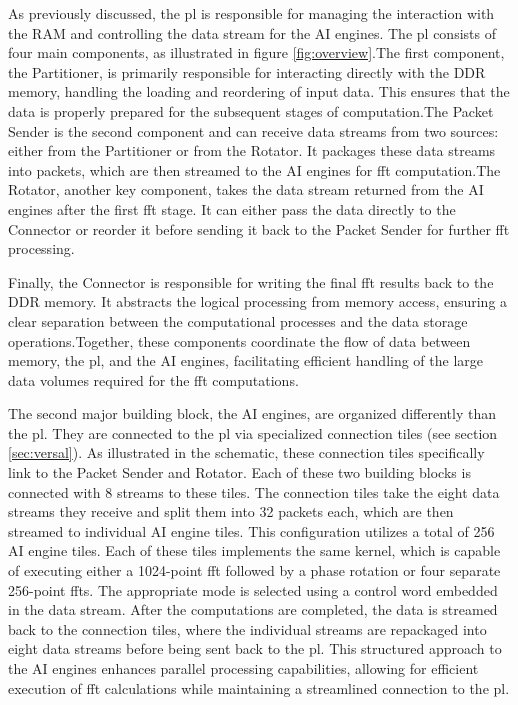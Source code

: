 As previously discussed, the \ac{pl} is responsible for managing the interaction with the RAM and controlling the data stream for the AI engines. The \ac{pl} consists of four main components, as illustrated in figure \ref{fig:overview}.The first component, the Partitioner, is primarily responsible for interacting directly with the DDR memory, handling the loading and reordering of input data. This ensures that the data is properly prepared for the subsequent stages of computation.The Packet Sender is the second component and can receive data streams from two sources: either from the Partitioner or from the Rotator. It packages these data streams into packets, which are then streamed to the AI engines for \ac{fft} computation.The Rotator, another key component, takes the data stream returned from the AI engines after the first \ac{fft} stage. It can either pass the data directly to the Connector or reorder it before sending it back to the Packet Sender for further \ac{fft} processing.\par
Finally, the Connector is responsible for writing the final \ac{fft} results back to the DDR memory. It abstracts the logical processing from memory access, ensuring a clear separation between the computational processes and the data storage operations.Together, these components coordinate the flow of data between memory, the \ac{pl}, and the AI engines, facilitating efficient handling of the large data volumes required for the \ac{fft} computations.\par
The second major building block, the AI engines, are organized differently than the \ac{pl}. They are connected to the \ac{pl} via specialized connection tiles (see section \ref{sec:versal}). As illustrated in the schematic, these connection tiles specifically link to the Packet Sender and Rotator. Each of these two building blocks is connected with 8 streams to these tiles. The connection tiles take the eight data streams they receive and split them into 32 packets each, which are then streamed to individual AI engine tiles. This configuration utilizes a total of 256 AI engine tiles. Each of these tiles implements the same kernel, which is capable of executing either a 1024-point \ac{fft} followed by a phase rotation or four separate 256-point \ac{fft}s. The appropriate mode is selected using a control word embedded in the data stream. After the computations are completed, the data is streamed back to the connection tiles, where the individual streams are repackaged into eight data streams before being sent back to the \ac{pl}. This structured approach to the AI engines enhances parallel processing capabilities, allowing for efficient execution of \ac{fft} calculations while maintaining a streamlined connection to the \ac{pl}.

